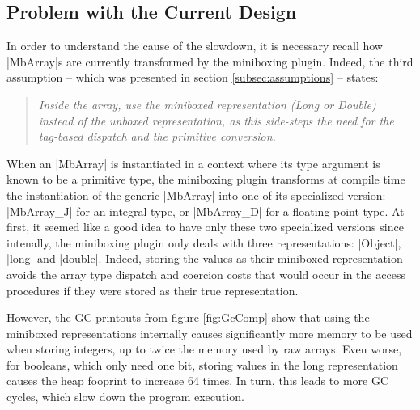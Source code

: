 \vfill

\subsection{Problem with the Current Design}

In order to understand the cause of the slowdown, it is necessary recall how |MbArray|s are currently transformed by the miniboxing plugin. Indeed, the third assumption -- which was presented in section \ref{subsec:assumptions} -- states:
\begin{quote}
\textit{Inside the array, use the miniboxed representation (Long or Double) instead of the unboxed representation, as this side-steps the need for the tag-based dispatch and the primitive conversion.}
\end{quote}
When an |MbArray| is instantiated in a context where its type argument is known to be a primitive type, the miniboxing plugin transforms at compile time the instantiation of the generic |MbArray| into one of its specialized version: |MbArray_J| for an integral type, or |MbArray_D| for a floating point type.
At first, it seemed like a good idea to have only these two specialized versions since intenally, the miniboxing plugin only deals with three representations: |Object|, |long| and |double|. Indeed, storing the values as their miniboxed representation avoids the array type dispatch and coercion costs that would occur in the access procedures if they were stored as their true representation. 

However, the GC printouts from figure \ref{fig:GcComp} show that using the miniboxed representations internally causes significantly more memory to be used when storing integers, up to twice the memory used by raw arrays. Even worse, for booleans, which only need one bit, storing values in the long representation causes the heap fooprint to increase 64 times. In turn, this leads to more GC cycles, which slow down the program execution.


